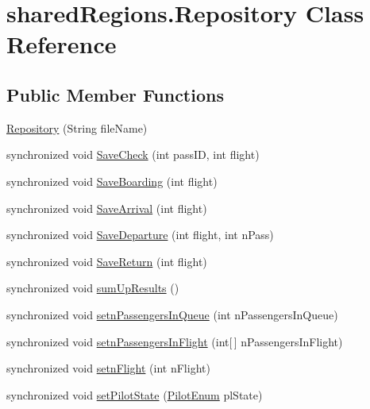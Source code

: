 \hypertarget{classshared_regions_1_1_repository}{}\section{shared\+Regions.\+Repository Class Reference}
\label{classshared_regions_1_1_repository}
\subsection*{Public Member Functions}
\begin{DoxyCompactItemize}
\item 
\hyperlink{classshared_regions_1_1_repository_a977ec108837b2cfa0852d7e94f7f53dc}{Repository} (String file\+Name)
\item 
synchronized void \hyperlink{classshared_regions_1_1_repository_a0605714eca9f1b1d33bcf6aa829cca4e}{Save\+Check} (int pass\+ID, int flight)
\item 
synchronized void \hyperlink{classshared_regions_1_1_repository_a325b96a2510f6ebe8aad62f417a11e67}{Save\+Boarding} (int flight)
\item 
synchronized void \hyperlink{classshared_regions_1_1_repository_a6b066a95aa6b17fbf890698c82048cf5}{Save\+Arrival} (int flight)
\item 
synchronized void \hyperlink{classshared_regions_1_1_repository_a62d61843e1213324bf579c3db5c2fe96}{Save\+Departure} (int flight, int n\+Pass)
\item 
synchronized void \hyperlink{classshared_regions_1_1_repository_ace95e612ae18dffa8d67e34fa264153d}{Save\+Return} (int flight)
\item 
synchronized void \hyperlink{classshared_regions_1_1_repository_ad1f23250d858b294d3d443367c88a855}{sum\+Up\+Results} ()
\item 
synchronized void \hyperlink{classshared_regions_1_1_repository_afcbe0092a2ca34a1f8c13cd4d37a7bde}{setn\+Passengers\+In\+Queue} (int n\+Passengers\+In\+Queue)
\item 
synchronized void \hyperlink{classshared_regions_1_1_repository_aea740a0c5225eaffb757bf31f690985d}{setn\+Passengers\+In\+Flight} (int\mbox{[}$\,$\mbox{]} n\+Passengers\+In\+Flight)
\item 
synchronized void \hyperlink{classshared_regions_1_1_repository_a861524965e041f635a18ed7dab515644}{setn\+Flight} (int n\+Flight)
\item 
synchronized void \hyperlink{classshared_regions_1_1_repository_afe742ad0e099e2dc3f936ed2ae6fe32d}{set\+Pilot\+State} (\hyperlink{enumentities_1_1_pilot_enum}{Pilot\+Enum} pl\+State)

\end{DoxyCompactItemize}
